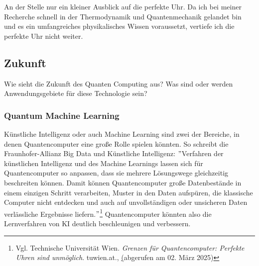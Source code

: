 \begin{tcolorbox}[title=Kommentar,
    title filled=false,
    colback=cyan!5!white,
    colframe=cyan!75!black]
    An der Stelle nur ein kleiner Ausblick auf die perfekte Uhr.
    Da ich bei meiner Recherche schnell in der Thermodynamik und Quantenmechanik gelandet bin und es ein umfangreiches physikalisches Wissen voraussetzt, vertiefe ich die perfekte Uhr nicht weiter.
\end{tcolorbox}


\subsection{Zukunft}
\label{subsec:zunft}

Wie sieht die Zukunft des Quanten Computing aus?
Was sind oder werden Anwendungsgebiete für diese Technologie sein?\\

\subsubsection{Quantum Machine Learning}
\label{subsubsec:quantum-machine-learning}
Künstliche Intelligenz oder auch Machine Learning sind zwei der Bereiche, in denen Quantencomputer eine große Rolle spielen könnten.
So schreibt die Fraunhofer-Allianz Big Data und Künstliche Intelligenz: \("\)Verfahren der künstlichen Intelligenz und des Machine Learnings lassen sich für Quantencomputer so anpassen, dass sie mehrere Lösungswege gleichzeitig beschreiten können.
Damit können Quantencomputer große Datenbestände in einem einzigen Schritt verarbeiten, Muster in den Daten aufspüren, die klassische Computer nicht entdecken und auch auf unvollständigen oder unsicheren Daten verlässliche Ergebnisse liefern.\("\)\footnote{Vgl. Technische Universität Wien. \textit{Grenzen für Quantencomputer: Perfekte Uhren sind unmöglich}. tuwien.at., \href{https://www.tuwien.at/tu-wien/aktuelles/news/grenzen-fuer-quantencomputer-perfekte-uhren-sind-unmoeglich} (abgerufen am 02. März 2025)}
Quantencomputer könnten also die Lernverfahren von KI deutlich beschleunigen und verbessern.\\

